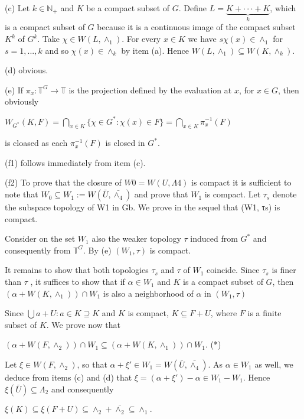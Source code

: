 \documentclass[12pt]{article}
\begin{document}
\begin{itemize}
\begin{itemize}
    (c) Let $k \in \mathbb{N}_+$ and $K$ be a compact subset of $G$. Define $L = \underbrace{K + · · · + K}_k$, which is a compact subset of
$G$ because it is a continuous image of the compact subset $K^k$ of $G^k$. Take $\chi \in W(L,\wedge_1)$. For every $x \in K$ we
have $s\chi(x) \in \wedge_1$ for $s = 1, . . . , k$ and so $\chi(x) \in \wedge_k$ by item (a). Hence $W(L,\wedge_1) \subseteq W(K,\wedge_k)$.


    (d) obvious.


    (e) If $\pi_x : \mathbb{T}^G \to \mathbb{T}$ is the projection defined by the evaluation at $x$, for $x \in G$, then obviously


    $W_{G^*} (K, F) = \bigcap_{x \in K} \{\chi \in G^*: \chi(x) \in F\} = \bigcap_{x \in K}\pi^{-1}_{x}(F)$


is cloased as each $\pi^{-1}_{x}(F)$ is closed in $G^*$.


    (f1) follows immediately from item (c).


    (f2) To prove that the closure of $W0 = W(U,Λ4)$ is compact it is sufficient to note that $W_0 \subseteq W_1 := W(\bar{U},\bar{\wedge_4})$
and prove that $W_1$ is compact. Let $\tau_s$ denote the subspace topology of W1 in Gb. We prove in the sequel that
(W1, τs) is compact.


    Consider on the set $W_1$ also the weaker topology $\tau$ induced from $G^*$ and consequently from $\mathbb{T}^G$. By (e)
$(W_1, \tau)$ is compact.


    It remains to show that both topologies $\tau_s$ and $\tau$ of $W_1$ coincide. Since $\tau_s$ is finer than $\tau$ , it suffices to show
that if $\alpha \in W_1$ and $K$ is a compact subset of $G$, then $(\alpha + W(K,\wedge_1)) \cap W_1$ is also a neighborhood of $\alpha$ in
$(W_1, \tau)$


    Since $\bigcup{a + U : a \in K} \supseteq K$ and $K$ is compact, $K \subseteq F + U$, where $F$ is a finite subset of $K$. We prove
now that


    $(\alpha + W(F,\wedge_2)) \cap W_1 \subseteq (\alpha + W(K,\wedge_1)) \cap W_1$. (*) 


    Let $\xi \in W(F,\wedge_2)$, so that $\alpha + \xi' \in W_1 = W(\bar{U},\bar{\wedge_4})$. As $\alpha \in W_1$ as well, we deduce from items (c) and (d) that
$\xi = (\alpha + \xi') - \alpha \in W_1 - W_1$. Hence $\xi(\bar{U}) \subseteq Λ_2$ and consequently
    

    $\xi(K) \subseteq \xi(F + U) \subseteq \wedge_2 + \bar{\wedge_2} \subseteq \wedge_1.$



\end{itemize}
\end{itemize}
\end{document}
